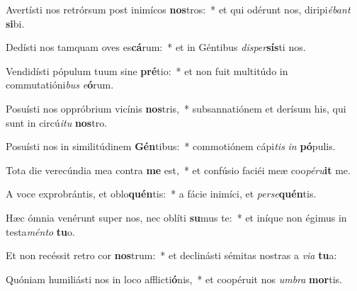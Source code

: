 \item Avertísti nos retrórsum post inimícos \textbf{nos}tros:~* et qui odérunt nos, diripi\textit{é}\textit{bant} \textbf{si}bi.
\item Dedísti nos tamquam oves es\textbf{cá}rum:~* et in Géntibus \textit{di}\textit{sper}\textbf{sís}ti nos.
\item Vendidísti pópulum tuum sine \textbf{pré}tio:~* et non fuit multitúdo in commutatióni\textit{bus} \textit{e}\textbf{ó}rum.
\item Posuísti nos oppróbrium vicínis \textbf{nos}tris,~* subsannatiónem et derísum his, qui sunt in circú\textit{i}\textit{tu} \textbf{nos}tro.
\item Posuísti nos in similitúdinem \textbf{Gén}tibus:~* commotiónem cápi\textit{tis} \textit{in} \textbf{pó}pulis.
\item Tota die verecúndia mea contra \textbf{me} est,~* et confúsio faciéi meæ coo\textit{pé}\textit{ru}\textbf{it} me.
\item A voce exprobrántis, et oblo\textbf{quén}tis:~* a fácie inimíci, et \textit{per}\textit{se}\textbf{quén}tis.
\item Hæc ómnia venérunt super nos, nec oblíti \textbf{su}mus te:~* et iníque non égimus in testa\textit{mén}\textit{to} \textbf{tu}o.
\item Et non recéssit retro cor \textbf{nos}trum:~* et declinásti sémitas nostras a \textit{vi}\textit{a} \textbf{tu}a:
\item Quóniam humiliásti nos in loco afflicti\textbf{ó}nis,~* et coopéruit nos \textit{um}\textit{bra} \textbf{mor}tis.
